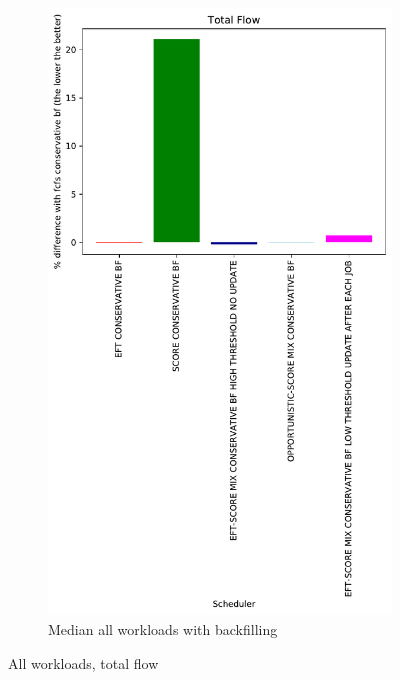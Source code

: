 \documentclass[a4paper]{article}
\begin{document}
\begin{figure}[H]
\begin{subfigure}[b]{0.4\linewidth}\centering\includegraphics[width=1\linewidth]{MBSS/plot/Results_Percentage_FCFS_BF_All_workloads_mediane_Total_Flow_450_128_32_256_4_1024.pdf}\caption{Median all workloads with backfilling}\end{subfigure}
\caption{All workloads, total flow}\end{figure}
\end{document}
